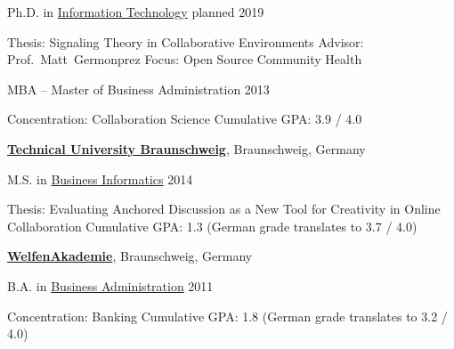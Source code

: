 \documentclass[letterpaper,MMMyyyy,nonstopmode]{simpleresumecv}
\begin{document}
\begin{Body}
\Gap
\BulletItem
Ph.D. in
\href{https://www.unomaha.edu/college-of-information-science-and-technology/phd-it/index.php}
{Information Technology}
\hfill
planned 2019
\begin{Detail}
\SubBulletItem
Thesis:
Signaling Theory in Collaborative Environments
\SubBulletItem
Advisor:
Prof.~Matt~Germonprez
\SubBulletItem
Focus:
Open Source Community Health
\end{Detail}

\Gap
\BulletItem
MBA -- Master of Business Administration
\hfill
2013
\begin{Detail}
\SubBulletItem
Concentration:
Collaboration Science
\SubBulletItem
Cumulative GPA: 
3.9 / 4.0
\end{Detail}

\BigGap
\Entry
\href{http://www.tu-bs.de}
{\textbf{Technical University Braunschweig}},
Braunschweig, Germany

\Gap
\BulletItem
M.S. in
\href{http://blog.wi2-tubs.de/}
{Business Informatics}
\hfill
2014
\begin{Detail}
\SubBulletItem
Thesis:
Evaluating Anchored Discussion as a New Tool for Creativity in Online Collaboration
\SubBulletItem
Cumulative GPA: 
1.3 (German grade translates to 3.7 / 4.0)
\end{Detail}

\BigGap
\Entry
\href{http://www.welfenakademie.de/}
{\textbf{WelfenAkademie}},
Braunschweig, Germany

\Gap
\BulletItem
B.A. in
\href{http://www.welfenakademie.de/vertiefungsrichtungen-bwl/}
{Business Administration}
\hfill
2011
\begin{Detail}
\SubBulletItem
Concentration: Banking
\SubBulletItem
Cumulative GPA: 
1.8 (German grade translates to 3.2 / 4.0)
\end{Detail}





\end{Body}
\end{document}
